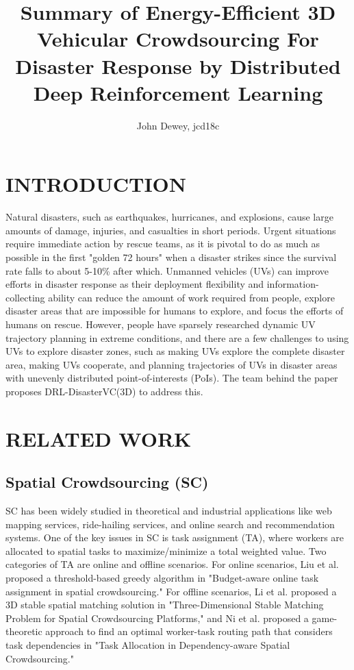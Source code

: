\documentclass[sigconf, natbib=false]{acmart}
\begin{document}
   \title{Summary of Energy-Efficient 3D Vehicular Crowdsourcing For Disaster Response by Distributed Deep Reinforcement Learning}
   \author{John Dewey, jcd18c}
   \maketitle

   \section{INTRODUCTION}
   Natural disasters, such as earthquakes, hurricanes, and explosions, cause large amounts of damage, injuries, and casualties in short periods. Urgent situations require immediate action by rescue teams, as it is pivotal to do as much as possible in the first "golden 72 hours" when a disaster strikes since the survival rate falls to about 5-10\% after which. Unmanned vehicles (UVs) can improve efforts in disaster response as their deployment flexibility and information-collecting ability can reduce the amount of work required from people, explore disaster areas that are impossible for humans to explore, and focus the efforts of humans on rescue. However, people have sparsely researched dynamic UV trajectory planning in extreme conditions, and there are a few challenges to using UVs to explore disaster zones, such as making UVs explore the complete disaster area, making UVs cooperate, and planning trajectories of UVs in disaster areas with unevenly distributed point-of-interests (PoIs). The team behind the paper proposes DRL-DisasterVC(3D) to address this.

   \section{RELATED WORK}
   \subsection{Spatial Crowdsourcing (SC)}
   SC has been widely studied in theoretical and industrial applications like web mapping services, ride-hailing services, and online search and recommendation systems. One of the key issues in SC is task assignment (TA), where workers are allocated to spatial tasks to maximize/minimize a total weighted value. Two categories of TA are online and offline scenarios. For online scenarios, Liu et al. proposed a threshold-based greedy algorithm in "Budget-aware online task assignment in spatial crowdsourcing." For offline scenarios, Li et al. proposed a 3D stable spatial matching solution in "Three-Dimensional Stable Matching Problem for Spatial Crowdsourcing Platforms," and Ni et al. proposed a game-theoretic approach to find an optimal worker-task routing path that considers task dependencies in "Task Allocation in Dependency-aware Spatial Crowdsourcing."
\end{document}

